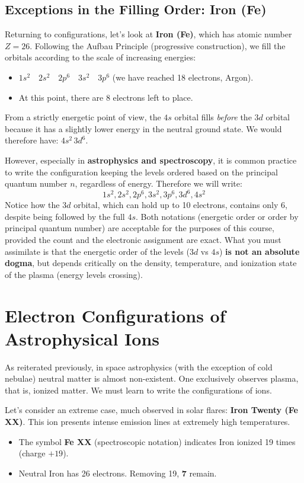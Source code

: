 \subsection{Exceptions in the Filling Order: Iron (Fe)}

Returning to configurations, let's look at \textbf{Iron (Fe)}, which has atomic number \textbf{$Z = 26$}.
Following the Aufbau Principle (progressive construction), we fill the orbitals according to the scale of increasing energies:
\begin{itemize}
\item $1s^2 \quad 2s^2 \quad 2p^6 \quad 3s^2 \quad 3p^6$ (we have reached 18 electrons, Argon).
\item At this point, there are 8 electrons left to place.
\end{itemize}
From a strictly energetic point of view, the $4s$ orbital fills \textit{before} the $3d$ orbital because it has a slightly lower energy in the neutral ground state. We would therefore have: $4s^2 \, 3d^6$.

However, especially in \textbf{astrophysics and spectroscopy}, it is common practice to write the configuration keeping the levels ordered based on the principal quantum number $n$, regardless of energy. Therefore we will write:
\begin{equation}
1s^2 , 2s^2 , 2p^6 , 3s^2 , 3p^6 , 3d^6 , 4s^2
\end{equation}
Notice how the $3d$ orbital, which can hold up to 10 electrons, contains only 6, despite being followed by the full $4s$. Both notations (energetic order or order by principal quantum number) are acceptable for the purposes of this course, provided the count and the electronic assignment are exact.
What you must assimilate is that the energetic order of the levels ($3d$ vs $4s$) \textbf{is not an absolute dogma}, but depends critically on the density, temperature, and ionization state of the plasma (energy levels crossing).

\section{Electron Configurations of Astrophysical Ions}

As reiterated previously, in space astrophysics (with the exception of cold nebulae) neutral matter is almost non-existent. One exclusively observes plasma, that is, ionized matter. We must learn to write the configurations of ions.

Let's consider an extreme case, much observed in solar flares: \textbf{Iron Twenty (Fe XX)}.
This ion presents intense emission lines at extremely high temperatures.
\begin{itemize}
\item The symbol \textbf{Fe XX} (spectroscopic notation) indicates Iron ionized 19 times (charge \textbf{$+19$}).
\item Neutral Iron has 26 electrons. Removing 19, \textbf{7} remain.
\end{itemize}

